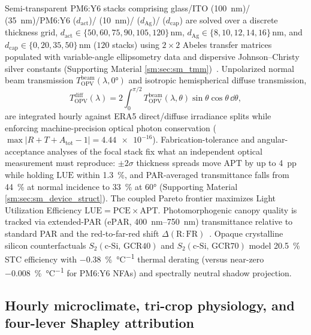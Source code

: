 \documentclass[preprint,12pt,a4paper]{elsarticle}
\begin{document}
Semi-transparent PM6:Y6 stacks comprising glass/\allowbreak ITO (\qty{100}{\nano\meter})/\allowbreak {} (\qty{35}{\nano\meter})/\allowbreak PM6:Y6 ($d_{\mathrm{act}}$)/\allowbreak {} (\qty{10}{\nano\meter})/\allowbreak {} ($d_{\mathrm{Ag}}$)/\allowbreak {} ($d_{\mathrm{cap}}$) are solved over a discrete thickness grid, $d_{\mathrm{act}}\in\{50,60,75,90,105,120\}\,\unit{\nano\meter}$, $d_{\mathrm{Ag}}\in\{8,10,12,14,16\}\,\unit{\nano\meter}$, and $d_{\mathrm{cap}}\in\{0,20,35,50\}\,\unit{\nano\meter}$ ($\num{120}$ stacks) using $2\times 2$ Abeles transfer matrices populated with variable-angle ellipsometry data and dispersive Johnson--Christy silver constants (Supporting Material \cref{sm:sec:sm_tmm})~\cite{Lunt2011,Ravishankar2020,Shen2025NatCommun}. Unpolarized normal beam transmission $T_{\mathrm{OPV}}^{\mathrm{beam}}(\lambda,\ang{0})$ and isotropic hemispherical diffuse transmission,
\begin{equation}
 T_{\mathrm{OPV}}^{\mathrm{diff}}(\lambda) = 2\int_0^{\pi/2} T_{\mathrm{OPV}}^{\mathrm{beam}}(\lambda,\theta)\sin\theta\cos\theta\,\dd\theta,
 \label{eq:tmm_diff_main}
\end{equation}
are integrated hourly against ERA5 direct/diffuse irradiance splits while enforcing machine-precision optical photon conservation ($\max |R + T + A_{\mathrm{tot}} - 1| = \num{4.44e-16}$). Fabrication-tolerance and angular-acceptance analyses of the focal stack fix what an independent optical measurement must reproduce: $\pm2\sigma$ thickness spreads move $\mathrm{APT}$ by up to \qty{4}{pp} while holding $\mathrm{LUE}$ within \qty{1.3}{\percent}, and PAR-averaged transmittance falls from \qty{44}{\percent} at normal incidence to \qty{33}{\percent} at \ang{60} (Supporting Material \cref{sm:sec:sm_device_struct}). The coupled Pareto frontier maximizes Light Utilization Efficiency $\mathrm{LUE} = \mathrm{PCE}\times \mathrm{APT}$. Photomorphogenic canopy quality is tracked via extended-PAR ($\mathrm{ePAR}$, \qtyrange{400}{750}{\nano\meter}) transmittance relative to standard PAR and the red-to-far-red shift $\Delta(\mathrm{R{:}FR})$~\cite{Thompson2020,Jiang2025IJMS}. Opaque crystalline silicon counterfactuals $S_2(\mathrm{c\text{-}Si,\,GCR40})$ and $S_2(\mathrm{c\text{-}Si,\,GCR70})$ model \qty{20.5}{\percent} STC efficiency with \qty{-0.38}{\percent\per\celsius} thermal derating (versus near-zero \qty{-0.008}{\percent\per\celsius} for PM6:Y6 NFAs) and spectrally neutral shadow projection.

\subsection{Hourly microclimate, tri-crop physiology, and four-lever Shapley attribution}
\label{sec:methods_agro}
\end{document}
